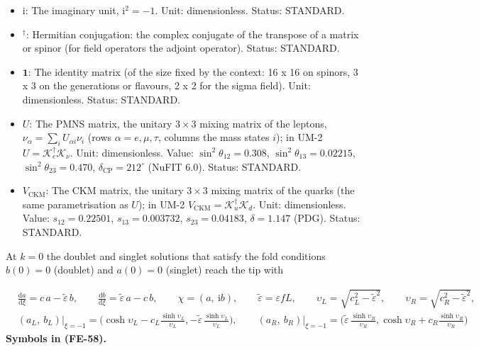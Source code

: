\documentclass[
  10pt,
]{article}
\begin{document}
\begin{itemize}
  \(\chi = (\chi_1, \chi_2)^T = (a, \mathrm{i}b)^T\); \(\chi_o\) the
  Kohn-Sham orbital \(o\), normalised as
  \(\int_{-L}^{0}\chi_o^\dagger\chi_o\,\mathrm{d}y = 1\). Unit:
  \(\mathrm{GeV}^{1/2}\) (normalised orbital). Status: DERIVED.
\item
  \(\mathrm{i}\): The imaginary unit, \(\mathrm{i}^2 = -1\). Unit:
  dimensionless. Status: STANDARD.
\item
  \({}^\dagger\): Hermitian conjugation: the complex conjugate of the
  transpose of a matrix or spinor (for field operators the adjoint
  operator). Status: STANDARD.
\item
  \(\mathbf{1}\): The identity matrix (of the size fixed by the context:
  16 x 16 on spinors, 3 x 3 on the generations or flavours, 2 x 2 for
  the sigma field). Unit: dimensionless. Status: STANDARD.
\item
  \(U\): The PMNS matrix, the unitary \(3 \times 3\) mixing matrix of
  the leptons, \(\nu_\alpha = \sum_iU_{\alpha i}\nu_i\) (rows
  \(\alpha = e, \mu, \tau\), columns the mass states \(i\)); in UM-2
  \(U = \mathcal{K}_e^\dagger\mathcal{K}_\nu\). Unit: dimensionless.
  Value: \(\sin^2\theta_{12} = 0.308\), \(\sin^2\theta_{13} = 0.02215\),
  \(\sin^2\theta_{23} = 0.470\), \(\delta_{\mathrm{CP}} = 212^\circ\)
  (NuFIT 6.0). Status: STANDARD.
\item
  \(V_{\mathrm{CKM}}\): The CKM matrix, the unitary \(3 \times 3\)
  mixing matrix of the quarks (the same parametrisation as \(U\)); in
  UM-2 \(V_{\mathrm{CKM}} = \mathcal{K}_u^\dagger\mathcal{K}_d\). Unit:
  dimensionless. Value: \(s_{12} = 0.22501\), \(s_{13} = 0.003732\),
  \(s_{23} = 0.04183\), \(\delta = 1.147\) (PDG). Status: STANDARD.
\end{itemize}

At \(k = 0\) the doublet and singlet solutions that satisfy the fold
conditions \(b(0) = 0\) (doublet) and \(a(0) = 0\) (singlet) reach the
tip with

\[
\begin{aligned}
&\frac{\mathrm{d}a}{\mathrm{d}\xi} = c\,a - \tilde\varepsilon\,b,\qquad
 \frac{\mathrm{d}b}{\mathrm{d}\xi} = \tilde\varepsilon\,a - c\,b,
 \qquad \chi = (a,\ \mathrm{i}b),\qquad \tilde\varepsilon = \varepsilon fL,\qquad
 \upsilon_L = \sqrt{c_L^2 - \tilde\varepsilon^2},\qquad \upsilon_R = \sqrt{c_R^2 - \tilde\varepsilon^2},\\
&(a_L,\ b_L)\big\vert_{\xi=-1} = \Big(\cosh\upsilon_L - c_L\frac{\sinh\upsilon_L}{\upsilon_L},
 -\tilde\varepsilon\,\frac{\sinh\upsilon_L}{\upsilon_L}\Big),\qquad
 (a_R,\ b_R)\big\vert_{\xi=-1} = \Big(\tilde\varepsilon\,\frac{\sinh\upsilon_R}{\upsilon_R},
 \cosh\upsilon_R + c_R\frac{\sinh\upsilon_R}{\upsilon_R}\Big)
\end{aligned} \tag{FE-58}
\] \textbf{Symbols in (FE-58).}
\end{document}
